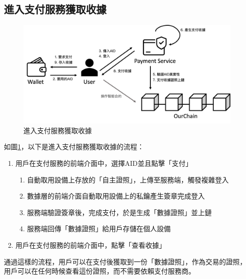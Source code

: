 \subsection{進入支付服務獲取收據}
\begin{figure}
  \centering
  \includegraphics[width=\linewidth, keepaspectratio]{figures/implement-2.png}
  \caption{進入支付服務獲取收據}
  \label{fig:implement-2}
\end{figure}
如圖\ref{fig:implement-2}，以下是進入支付服務獲取收據的流程：
\begin{enumerate}
  \item 用戶在支付服務的前端介面中，選擇AID並且點擊「支付」
        \begin{enumerate}
          \item 自動取用設備上存放的「自主證照」，上傳至服務端，觸發複雜登入
          \item 數據層的前端介面自動取用設備上的私鑰產生簽章完成登入
          \item 服務端驗證簽章後，完成支付，於是生成「數據證照」並上鏈
          \item 服務端回傳「數據證照」給用戶存儲在個人設備
        \end{enumerate}
  \item 用戶在支付服務的前端介面中，點擊「查看收據」
\end{enumerate}
通過這樣的流程，用戶可以在支付後獲取到一份「數據證照」，作為交易的證照，用戶可以在任何時候查看這份證照，而不需要依賴支付服務商。
